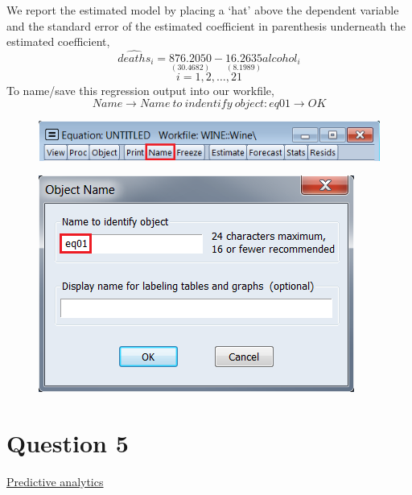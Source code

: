\documentclass[12pt]{report}
\begin{document}
		\vspace{-\baselineskip}
		\noindent We report the estimated model by placing a `hat' above the dependent variable and the standard error of the estimated coefficient in parenthesis underneath the estimated coefficient,
		$$\widehat{deaths}_i = \underset{(30.4682)}{876.2050}-\underset{(8.1989)}{16.2635}alcohol_i$$
		$$i = 1, 2, \dots, 21$$
		\noindent To name/save this regression output into our workfile,
		$$Name \to Name\ to\ indentify\ object:eq01 \to OK$$
		\begin{figure}[H]
			\centering
			\includegraphics{esteqn3}
		\end{figure}
		\vspace{-\baselineskip}
		\begin{figure}[H]
			\centering
			\includegraphics{esteqn4}
		\end{figure}
		\vspace{-\baselineskip}
	\newpage	
	\section*{Question 5}
	\underline{Predictive analytics}
	
\end{document}
